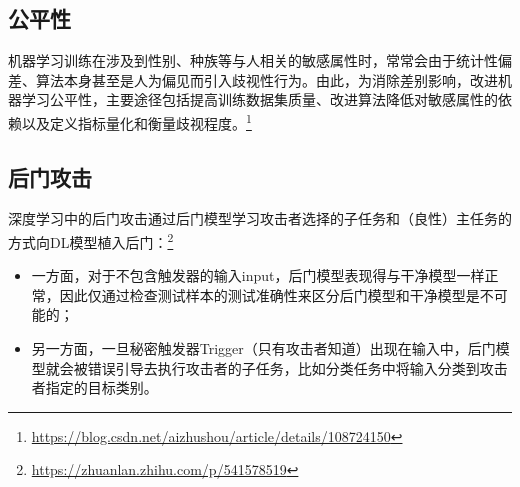 \subsection{公平性}
机器学习训练在涉及到性别、种族等与人相关的敏感属性时，常常会由于统计性偏差、算法本身甚至是人为偏见而引入歧视性行为。由此，为消除差别影响，改进机器学习公平性，主要途径包括提高训练数据集质量、改进算法降低对敏感属性的依赖以及定义指标量化和衡量歧视程度。\footnote{\url{https://blog.csdn.net/aizhushou/article/details/108724150}}

\subsection{后门攻击}
深度学习中的后门攻击通过后门模型学习攻击者选择的子任务和（良性）主任务的方式向DL模型植入后门：\footnote{\url{https://zhuanlan.zhihu.com/p/541578519}}
\begin{itemize}
    \item 一方面，对于不包含触发器的输入input，后门模型表现得与干净模型一样正常，因此仅通过检查测试样本的测试准确性来区分后门模型和干净模型是不可能的；
    \item 另一方面，一旦秘密触发器Trigger（只有攻击者知道）出现在输入中，后门模型就会被错误引导去执行攻击者的子任务，比如分类任务中将输入分类到攻击者指定的目标类别。
\end{itemize}
